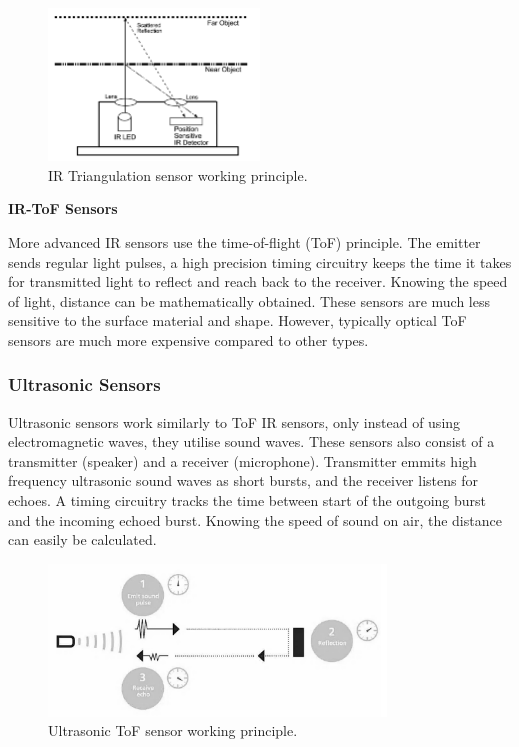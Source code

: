 \documentclass[12pt, a4paper]{article}
\begin{document}
                    \begin{figure}[H]\centering
                        \includegraphics[width=0.5\textwidth]{triangulation}
                        \caption[]{IR Triangulation sensor working principle.}\label{fig:triangulation}
                    \end{figure}
                
                \bigskip\noindent
                \textbf{IR-ToF Sensors}

                    More advanced IR sensors use the time-of-flight (ToF) principle. The emitter sends regular light pulses, a high precision timing circuitry keeps the time it takes for transmitted light to reflect and reach back to the receiver. Knowing the speed of light, distance can be mathematically obtained. These sensors are much less sensitive to the surface material and shape. However, typically optical ToF sensors are much more expensive compared to other types.

                    
            
            \subsubsection{Ultrasonic Sensors}
                Ultrasonic sensors work similarly to ToF IR sensors, only instead of using electromagnetic waves, they utilise sound waves. These sensors also consist of a transmitter (speaker) and a receiver (microphone). Transmitter emmits high frequency ultrasonic sound waves as short bursts, and the receiver listens for echoes. A timing circuitry tracks the time between start of the outgoing burst and the incoming echoed burst. Knowing the speed of sound on air, the distance can easily be calculated.

                \begin{figure}[H]\centering
                    \includegraphics[width=0.8\textwidth]{ultrasonic.png}
                    \caption[]{Ultrasonic ToF sensor working principle.}\label{fig:ultrasonic}
                \end{figure}
\end{document}
